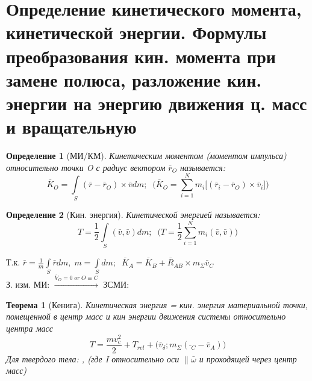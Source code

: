 \documentclass[12pt]{article}
\newtheorem{determenition}{Определение}
\newtheorem{theorem}{Теорема}
\begin{document}
\section{Определение кинетического момента, кинетической энергии. Формулы преобразования кин. момента при замене полюса, разложение кин. энергии на энергию движения ц. масс и вращательную}	
	\begin{determenition}[МИ/КМ]
		Кинетическим моментом (моментом импульса) относительно точки O  с радиус вектором $\bar{r}_O$ называется:
		$$\overline{K}_O=\int\limits_S(\bar{r} - \bar{r}_O) \times \bar{v} dm; \;\; 
		\Bigg(\overline{K}_O=\sum\limits_{i=1}^N m_i \Big[(\bar{r}_i - \bar{r}_O)\times \bar{v}_i\Big] \Bigg)  $$
	\end{determenition}
	\begin{determenition}[Кин. энергия]
		Кинетической энергией называется:
		$$T=\frac 1 2 \int\limits_S(\bar{v}, \bar{v}) dm;\;\;  
		\Bigg(T=\frac 1 2\sum\limits_{i=1}^N m_i (\bar{v}, \bar{v})\Bigg)$$
	\end{determenition}
	Т.к. $\bar{r}= \frac 1 m \int\limits_S \bar{r}dm, \; m=\int\limits_S dm;\;\;\overline{K}_A=\overline{K}_B+\overline{R}_{AB} \times m_{\Sigma}\bar{v}_C$\\
	 З. изм. МИ:
	$\xrightarrow{\overline{V}_O=0\; or \;O\equiv C }$  ЗСМИ:	\\
	
	\begin{theorem}[Кенига]
		Кинетическая энергия = кин. энергия материальной точки, помещенной в центр масс и кин энергии движения системы относительно центра масс
		$$T= \frac{m v_c^2}{2} + T_{rel} + \Big(\bar{v}_\delta; m_\Sigma (\bar{}_C - \bar{v}_A) \Big) $$
		Для твердого тела: , (где I относительно оси $\parallel \bar{\omega}$ и проходящей через центр масс)
	\end{theorem}	
\end{document}
